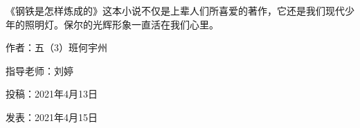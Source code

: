 《钢铁是怎样炼成的》这本小说不仅是上辈人们所喜爱的著作，它还是我们现代少年的照明灯。保尔的光辉形象一直活在我们心里。


\vspace{10pt}

作者：五（3）班何宇州

指导老师：刘婷



投稿：2021年4月13日

发表：2021年4月15日











                



\vspace{10pt}

\hline

